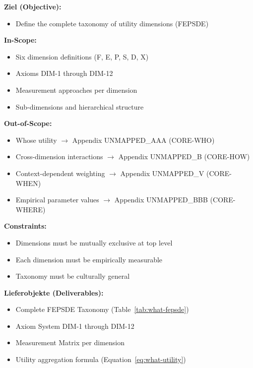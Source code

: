 \begin{tcolorbox}[
    colback=orange!5!white,
    colframe=orange!75!black,
    title={\textbf{Appendix Scope: Ziel / In-Scope / Out-of-Scope / Constraints}},
    fonttitle=\bfseries
]

\textbf{Ziel (Objective):}
\begin{itemize}[nosep]
    \item Define the complete taxonomy of utility dimensions (FEPSDE)
\end{itemize}

\textbf{In-Scope:}
\begin{itemize}[nosep]
    \item Six dimension definitions (F, E, P, S, D, X)
    \item Axioms DIM-1 through DIM-12
    \item Measurement approaches per dimension
    \item Sub-dimensions and hierarchical structure
\end{itemize}

\textbf{Out-of-Scope:}
\begin{itemize}[nosep]
    \item Whose utility $\rightarrow$ Appendix UNMAPPED_AAA (CORE-WHO)
    \item Cross-dimension interactions $\rightarrow$ Appendix UNMAPPED_B (CORE-HOW)
    \item Context-dependent weighting $\rightarrow$ Appendix UNMAPPED_V (CORE-WHEN)
    \item Empirical parameter values $\rightarrow$ Appendix UNMAPPED_BBB (CORE-WHERE)
\end{itemize}

\textbf{Constraints:}
\begin{itemize}[nosep]
    \item Dimensions must be mutually exclusive at top level
    \item Each dimension must be empirically measurable
    \item Taxonomy must be culturally general
\end{itemize}

\textbf{Lieferobjekte (Deliverables):}
\begin{itemize}[nosep]
    \item Complete FEPSDE Taxonomy (Table~\ref{tab:what-fepsde})
    \item Axiom System DIM-1 through DIM-12
    \item Measurement Matrix per dimension
    \item Utility aggregation formula (Equation~\ref{eq:what-utility})
\end{itemize}

\end{tcolorbox}

